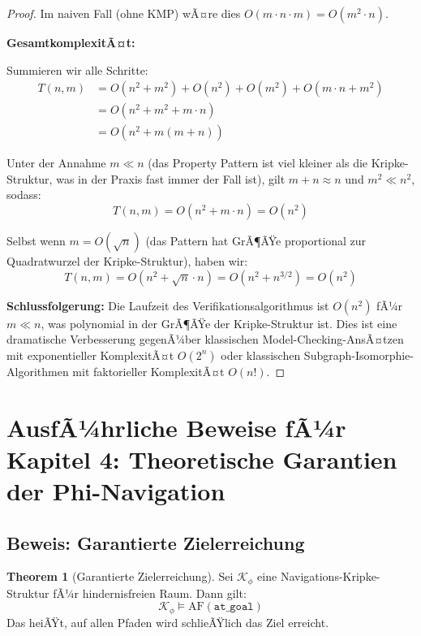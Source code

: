 ﻿\documentclass[a4paper,12pt]{article}
\theoremstyle{definition}
\newtheorem{theorem}{Theorem}[section]
\begin{document}
\begin{proof}
Im naiven Fall (ohne KMP) wÃ¤re dies $O(m \cdot n \cdot m) = O(m^2 \cdot n)$.

\textbf{GesamtkomplexitÃ¤t:}

Summieren wir alle Schritte:
\begin{align}
T(n, m) &= O(n^2 + m^2) + O(n^2) + O(m^2) + O(m \cdot n + m^2) \\
&= O(n^2 + m^2 + m \cdot n) \\
&= O(n^2 + m(m + n))
\end{align}

Unter der Annahme $m \ll n$ (das Property Pattern ist viel kleiner als die Kripke-Struktur, was in der Praxis fast immer der Fall ist), gilt $m + n \approx n$ und $m^2 \ll n^2$, sodass:
\begin{equation}
T(n, m) = O(n^2 + m \cdot n) = O(n^2)
\end{equation}

Selbst wenn $m = O(\sqrt{n})$ (das Pattern hat GrÃ¶ÃŸe proportional zur Quadratwurzel der Kripke-Struktur), haben wir:
\begin{equation}
T(n, m) = O(n^2 + \sqrt{n} \cdot n) = O(n^2 + n^{3/2}) = O(n^2)
\end{equation}

\textbf{Schlussfolgerung:} Die Laufzeit des Verifikationsalgorithmus ist $O(n^2)$ fÃ¼r $m \ll n$, was polynomial in der GrÃ¶ÃŸe der Kripke-Struktur ist. Dies ist eine dramatische Verbesserung gegenÃ¼ber klassischen Model-Checking-AnsÃ¤tzen mit exponentieller KomplexitÃ¤t $O(2^n)$ oder klassischen Subgraph-Isomorphie-Algorithmen mit faktorieller KomplexitÃ¤t $O(n!)$.
\end{proof}

\newpage

\section{AusfÃ¼hrliche Beweise fÃ¼r Kapitel 4: Theoretische Garantien der Phi-Navigation}

\subsection{Beweis: Garantierte Zielerreichung}

\begin{theorem}[Garantierte Zielerreichung]
Sei $\mathcal{K}_{\phi}$ eine Navigations-Kripke-Struktur fÃ¼r hindernisfreien Raum. Dann gilt:
\[
\mathcal{K}_{\phi} \models \text{AF}(\texttt{at\_goal})
\]
Das heiÃŸt, auf allen Pfaden wird schlieÃŸlich das Ziel erreicht.
\end{theorem}
\end{document}
